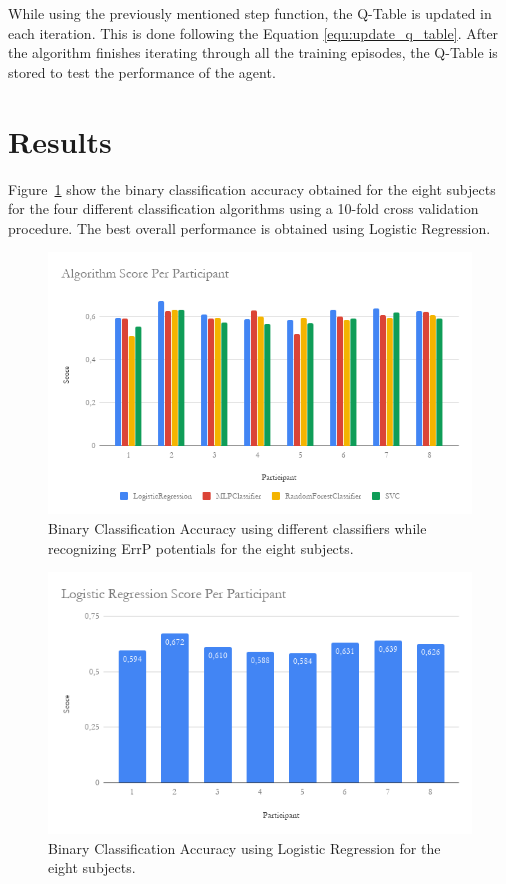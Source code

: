 \documentclass[journal]{IEEEtran}
\begin{document}
{{While using the previously mentioned step function, the Q-Table is updated in each iteration. This is done following the Equation \ref{equ:update_q_table}.  After the algorithm finishes iterating through all the training episodes, the Q-Table is stored to test the performance of the agent.


\section{Results}
\label{results}

Figure~\ref{fig:classifiers} show the binary classification accuracy obtained for the eight subjects for the four different classification algorithms using a 10-fold cross validation procedure.  The best overall performance is obtained using Logistic Regression.

\begin{figure}[h]
    \centering
    \includegraphics[scale=0.4]{Images/algorithm_calibration/Total_calib.png}
    \caption{Binary Classification Accuracy using different classifiers while recognizing ErrP potentials for the eight subjects.}
    \label{fig:classifiers}
\end{figure}

\begin{figure}[h]
    \centering
    \includegraphics[scale=0.4]{Images/algorithm_calibration/LR_calib.png}
    \caption{Binary Classification Accuracy using Logistic Regression for the eight subjects.}
    \label{fig:logisticregression}
\end{figure}

}}
\end{document}
